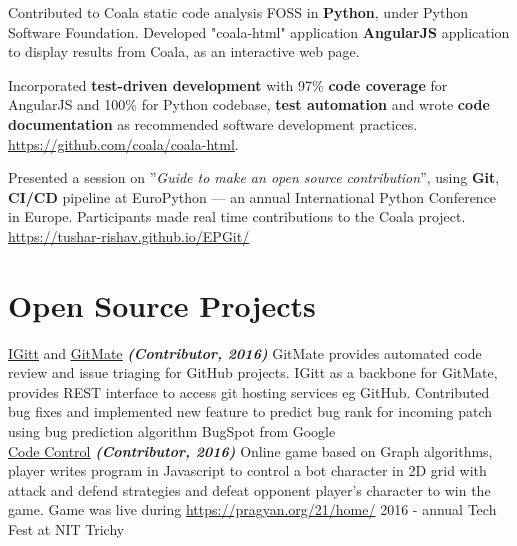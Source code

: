 \documentclass[]{deedy-resume-openfont}
\begin{document}
\begin{minipage}[t]{0.66\textwidth}
\begin{tightemize}     
\item Contributed to Coala \textemdash static code analysis FOSS \textemdash in \textbf{Python}, under Python Software Foundation. Developed "coala-html" application \textemdash \textbf{AngularJS} application to display results from Coala, as an interactive web page.
\item Incorporated \textbf{test-driven development} with 97\%    \textbf{code coverage} for AngularJS and 100\% for Python codebase, \textbf{test automation} and wrote \textbf{code documentation} as recommended software development practices. \href{https://github.com/coala/coala-html}{https://github.com/coala/coala-html}.
\end{tightemize}
\sectionsep

\begin{tightemize}
\item Presented a session on ”\textit{Guide to make an open source contribution}”, using \textbf{Git}, \textbf{CI/CD} pipeline at EuroPython — an annual International Python Conference in Europe. Participants made real time contributions to the Coala project. \href{https://tushar-rishav.github.io/EPGit/}{https://tushar-rishav.github.io/EPGit/}
\end{tightemize}
\sectionsep

\section{Open Source Projects}
\textbullet{} \href{https://gitlab.com/gitmate/open-source/IGitt}{\underline {IGitt}} and \href{https://gitlab.com/gitmate/open-source/gitmate-2}{\underline {GitMate}} {\footnotesize \textit{\textbf{(Contributor, 2016) }}} \textemdash GitMate provides automated code review and issue triaging for GitHub projects. IGitt as a backbone for GitMate, provides REST interface to access git hosting services eg GitHub. Contributed bug fixes and implemented new feature to predict bug rank for incoming patch using bug prediction algorithm BugSpot from Google \\
\textbullet{} \href{https://github.com/ash7594/code-control/commits?author=tushar-rishav}{\underline {Code Control}} {\footnotesize \textit{\textbf{(Contributor, 2016) }}} \textemdash Online game based on Graph algorithms, player writes program in Javascript to control a bot character in 2D grid with attack and defend strategies and defeat opponent player’s character to win the game. Game was live during \href{Pragyan}{https://pragyan.org/21/home/} 2016 - annual Tech Fest at NIT Trichy
\sectionsep

\end{minipage} 
\end{document}
